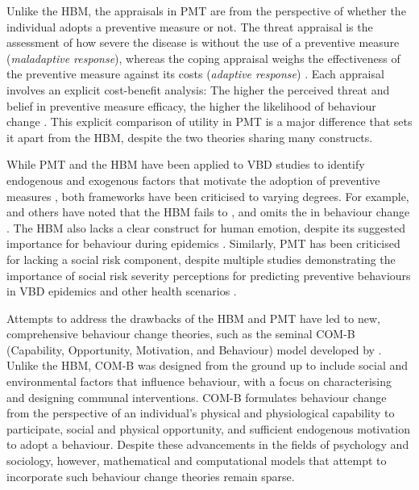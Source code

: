 Unlike the HBM, the appraisals in PMT are from the perspective of whether the individual adopts a preventive measure or not. The threat appraisal is the assessment of how severe the disease is without the use of a preventive measure (\textit{maladaptive response}), whereas the coping appraisal weighs the effectiveness of the preventive measure against its costs (\textit{adaptive response}) \cite{leith_motivation_2004}. Each appraisal involves an explicit cost-benefit analysis: The higher the perceived threat and belief in preventive measure efficacy, the higher the likelihood of behaviour change \cite{marikyan_protection_2023}. This explicit comparison of utility in PMT is a major difference that sets it apart from the HBM, despite the two theories sharing many constructs.

While PMT and the HBM have been applied to VBD studies to identify endogenous and exogenous factors that motivate the adoption of preventive measures \cite{vande_velde_integrated_2024, vizanko_modeling_2024, donohoe_tick-borne_2018, ghahremani_effect_2014}, both frameworks have been criticised to varying degrees. For example, \citet{bunton_theories_1991} and others have noted that the HBM fails to  \cite{williams_role_2010}, and omits the  in behaviour change \cite{michie_behaviour_2011}. The HBM also lacks a clear construct for human emotion, despite its suggested importance for behaviour during epidemics \cite{durham_incorporating_2012}. Similarly, PMT has been criticised for lacking a social risk component, despite multiple studies demonstrating the importance of social risk severity perceptions for predicting preventive behaviours in VBD epidemics \cite{lopes-rafegas_contribution_2023, vande_velde_integrated_2024} and other health scenarios \cite{pechmann_what_2003}.

Attempts to address the drawbacks of the HBM and PMT have led to new, comprehensive behaviour change theories, such as the seminal COM-B (Capability, Opportunity, Motivation, and Behaviour) model developed by \citet{michie_behaviour_2011}. Unlike the HBM, COM-B was designed from the ground up to include social and environmental factors that influence behaviour, with a focus on characterising and designing communal interventions. COM-B formulates behaviour change from the perspective of an individual's physical and physiological capability to participate, social and physical opportunity, and sufficient endogenous motivation to adopt a behaviour. Despite these advancements in the fields of psychology and sociology, however, mathematical and computational models that attempt to incorporate such behaviour change theories remain sparse.

